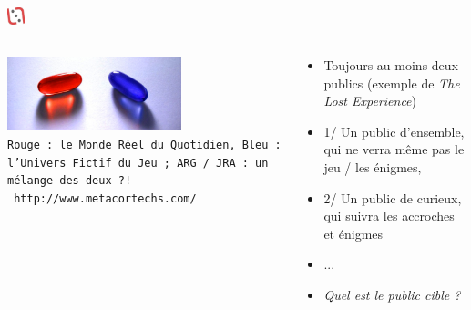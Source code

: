 \documentclass[slidetop,11pt]{beamer}
\def\moreInFrameTitleLeftt{\includegraphics[height=0.5cm]{img/ligueludique-0.png}~~~~~}
\begin{document}
\subsubsection{\sectionPartIIbIII} %
\begin{frame}
	\frametitle{\moreInFrameTitleLeftt \sectionPartIIbIII }
	\begin{columns}[T]
		\begin{column}[T]{5.10cm}
			\includegraphics[width=5.05cm]{img/ob_0ce702_pillules.jpg}~\\
			\texttt{\footnotesize Rouge : le Monde R{\'e}el du Quotidien, Bleu : l'Univers Fictif du Jeu ; ARG / JRA : un m{\'e}lange des deux ?! }~\\
			\texttt{ http://www.metacortechs.com/ }
		\end{column}
		\begin{column}[T]{5.80cm}
			 \begin{beamerboxesrounded}	[lower=substructureRED, %
							 upper=block title RED,%
							 shadow=true]%
				   {\sectionPartIIbIII}
				\begin{itemize}
					\item Toujours au moins deux publics (exemple de \emph{The Lost Experience})
					\item 1/ Un public d'ensemble, qui ne verra m{\^e}me pas le jeu / les {\'e}nigmes, 
					\item 2/ Un public de curieux, qui suivra les accroches et {\'e}nigmes
					\item ...
					\item \emph{Quel est le public cible ?}
				\end{itemize}
			\end{beamerboxesrounded}
		\end{column}
	\end{columns}
\end{frame} 

\def\sectionPartIIbIV{{\'E}vidences et formats / tailles : audiences}
\end{document}

